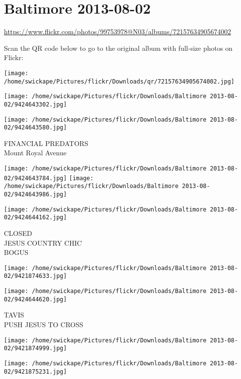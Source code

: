 \documentclass[10pt,letterpaper]{article}
\title{}
\author{}
\date{}
\begin{document}
\section*{Baltimore 2013-08-02}

\url{https://www.flickr.com/photos/99753978@N03/albums/72157634905674002}

Scan the QR code below to go to the original album with full-size photos on Flickr:

\texttt{[image: /home/swickape/Pictures/flickr/Downloads/qr/72157634905674002.jpg]}
\pagebreak

\texttt{[image: /home/swickape/Pictures/flickr/Downloads/Baltimore 2013-08-02/9424643302.jpg]}

\vspace{0.25in}
\texttt{[image: /home/swickape/Pictures/flickr/Downloads/Baltimore 2013-08-02/9424643580.jpg]}

FINANCIAL PREDATORS\\
Mount Royal Avenue
\pagebreak

\texttt{[image: /home/swickape/Pictures/flickr/Downloads/Baltimore 2013-08-02/9424643784.jpg]}
\texttt{[image: /home/swickape/Pictures/flickr/Downloads/Baltimore 2013-08-02/9424643986.jpg]}

\vspace{0.25in}
\texttt{[image: /home/swickape/Pictures/flickr/Downloads/Baltimore 2013-08-02/9424644162.jpg]}

CLOSED\\
JESUS COUNTRY CHIC\\
BOGUS
\pagebreak

\texttt{[image: /home/swickape/Pictures/flickr/Downloads/Baltimore 2013-08-02/9421874633.jpg]}

\vspace{0.25in}
\texttt{[image: /home/swickape/Pictures/flickr/Downloads/Baltimore 2013-08-02/9424644620.jpg]}

TAVIS\\
PUSH JESUS TO CROSS
\pagebreak

\texttt{[image: /home/swickape/Pictures/flickr/Downloads/Baltimore 2013-08-02/9421874999.jpg]}

\vspace{0.25in}
\texttt{[image: /home/swickape/Pictures/flickr/Downloads/Baltimore 2013-08-02/9421875231.jpg]}
\end{document}
